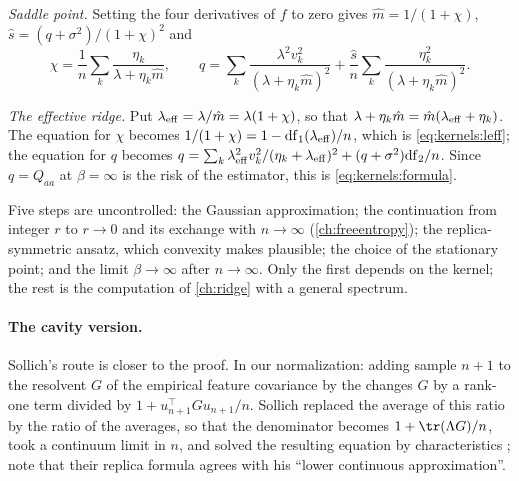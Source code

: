 \begin{refsection}
\begin{heuristic}
\emph{Saddle point.} Setting the four derivatives of $f$ to zero gives $\hat m=1/(1+\chi)$, $\hat s=(q+\sigma^2)/(1+\chi)^2$ and
\[
\chi=\frac1n\sum_k\frac{\eta_k}{\lambda+\eta_k\hat m},\qquad q=\sum_k\frac{\lambda^2v_k^2}{(\lambda+\eta_k\hat m)^2}+\frac{\hat s}n\sum_k\frac{\eta_k^2}{(\lambda+\eta_k\hat m)^2}.
\]

\emph{The effective ridge.} Put $\lambda_{\mathrm{eff}}=\lambda/\hat m=\lambda(1+\chi)$, so that $\lambda+\eta_k\hat m=\hat m(\lambda_{\mathrm{eff}}+\eta_k)$. The equation for $\chi$ becomes $1/(1+\chi)=1-\mathrm{df}_1(\lambda_{\mathrm{eff}})/n$, which is \eqref{eq:kernels:leff}; the equation for $q$ becomes $q=\sum_k\lambda_{\mathrm{eff}}^2v_k^2/(\eta_k+\lambda_{\mathrm{eff}})^2+(q+\sigma^2)\mathrm{df}_2/n$. Since $q=Q_{aa}$ at $\beta=\infty$ is the risk of the estimator, this is \eqref{eq:kernels:formula}.
\end{heuristic}

Five steps are uncontrolled: the Gaussian approximation; the continuation from integer $r$ to $r\to0$ and its exchange with $n\to\infty$ (\cref{ch:freeentropy}); the replica-symmetric ansatz, which convexity makes plausible; the choice of the stationary point; and the limit $\beta\to\infty$ after $n\to\infty$. Only the first depends on the kernel; the rest is the computation of \cref{ch:ridge} with a general spectrum.

\paragraph{The cavity version.} Sollich's route is closer to the proof. In our normalization: adding sample $n+1$ to the resolvent $G$ of the empirical feature covariance by the  changes $G$ by a rank-one term divided by $1+u_{n+1}^\top Gu_{n+1}/n$. Sollich replaced the average of this ratio by the ratio of the averages, so that the denominator becomes $1+\tr(\Lambda G)/n$, took a continuum limit in $n$, and solved the resulting equation by characteristics \parencite[\S2.2]{BordelonEtAl2020}; \textcite{CanatarEtAl2021} note that their replica formula agrees with his ``lower continuous approximation''.


\end{refsection}
